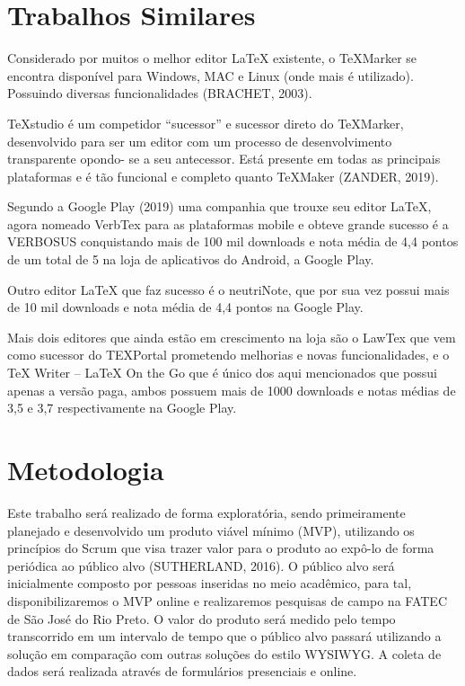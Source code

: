 \documentclass[article,12pt,oneside,a4paper,english,brazil,sumario=tradicional]{abntex2}
\begin{document}
\begin{footnotesize}
\section{Trabalhos Similares}

Considerado por muitos o melhor editor LaTeX existente, o TeXMarker se encontra disponível para Windows, 
	MAC e Linux (onde mais é utilizado). Possuindo diversas funcionalidades (BRACHET, 2003).

TeXstudio é um competidor “sucessor” e sucessor direto do TeXMarker, desenvolvido para ser um editor com 
	um processo de desenvolvimento transparente opondo- se a seu antecessor. Está presente em todas as principais 
	plataformas e é tão funcional e completo quanto TeXMaker (ZANDER, 2019).

Segundo a Google Play (2019) uma companhia que trouxe seu editor LaTeX, agora nomeado VerbTex para as 
	plataformas mobile e obteve grande sucesso é a VERBOSUS conquistando mais de 100 mil downloads e nota 
	média de 4,4 pontos de um total de 5 na loja de aplicativos do Android, a Google Play.

Outro editor LaTeX que faz sucesso é o neutriNote, que por sua vez possui mais de 10 mil downloads e 
	nota média de 4,4 pontos na Google Play.

Mais dois editores que ainda estão em crescimento na loja são o LawTex que vem como sucessor do 
	TEXPortal prometendo melhorias e novas funcionalidades, e o TeX Writer – LaTeX On the Go que é único dos 
	aqui mencionados que possui apenas a versão paga, ambos possuem mais de 1000 downloads e notas médias de 3,5 e 3,7 
	respectivamente na Google Play.





\section{Metodologia}

Este trabalho será realizado de forma exploratória, sendo primeiramente planejado e desenvolvido um produto 
	viável mínimo (MVP), utilizando os princípios do Scrum que visa trazer valor para o produto ao expô-lo de forma 
	periódica ao público alvo (SUTHERLAND, 2016). O público alvo será inicialmente composto por pessoas inseridas no 
	meio acadêmico, para tal, disponibilizaremos o MVP online e realizaremos pesquisas de campo na 
	FATEC de São José do Rio Preto. O valor do produto será medido pelo tempo transcorrido em um intervalo de tempo 
	que o público alvo passará utilizando a solução em comparação com outras soluções do estilo WYSIWYG. 
	A coleta de dados será realizada através de formulários presenciais e online.


\end{footnotesize}
\end{document}
